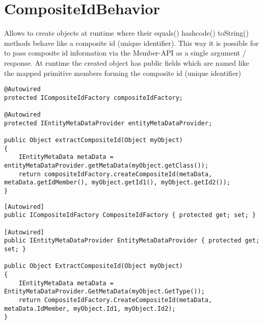 \section{CompositeIdBehavior}
\label{feature:CompositeIdBehavior}
\ClearAPI
Allows to create objects at runtime where their equals() hashcode() toString() methods behave like a composite id (unique identifier). This way it is possible for \AMBETH{} to pass composite id information via the Member-API as a single argument / response. At runtime the created object has public fields which are named like the mapped primitive members forming the composite id (unique identifier)

\begin{lstlisting}[style=Java,caption={Example usage to receive an instance of a composite id (Java)}]
@Autowired
protected ICompositeIdFactory compositeIdFactory;

@Autowired
protected IEntityMetaDataProvider entityMetaDataProvider;

public Object extractCompositeId(Object myObject)
{
	IEntityMetaData metaData = entityMetaDataProvider.getMetaData(myObject.getClass());
	return compositeIdFactory.createCompositeId(metaData, metaData.getIdMember(), myObject.getId1(), myObject.getId2());
}
\end{lstlisting}
\begin{lstlisting}[style=Csharp,caption={Example usage to receive an instance of a composite id (C\#)}]
[Autowired]
public ICompositeIdFactory CompositeIdFactory { protected get; set; }

[Autowired]
public IEntityMetaDataProvider EntityMetaDataProvider { protected get; set; }

public Object ExtractCompositeId(Object myObject)
{
	IEntityMetaData metaData = EntityMetaDataProvider.GetMetaData(myObject.GetType());
	return CompositeIdFactory.CreateCompositeId(metaData, metaData.IdMember, myObject.Id1, myObject.Id2);
}
\end{lstlisting}
